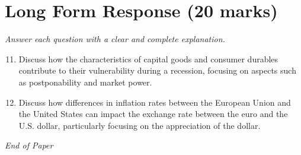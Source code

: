 \documentclass[12pt]{article}
\begin{document}
\section*{Long Form Response (20 marks)}
\textit{Answer each question with a clear and complete explanation.}
\begin{enumerate}[label=\arabic*.]
\setcounter{enumi}{10}
\item Discuss how the characteristics of capital goods and consumer durables contribute to their vulnerability during a recession, focusing on aspects such as postponability and market power.
\item Discuss how differences in inflation rates between the European Union and the United States can impact the exchange rate between the euro and the U.S. dollar, particularly focusing on the appreciation of the dollar.
\end{enumerate}

\vfill
\noindent\textit{End of Paper}
\end{document}
